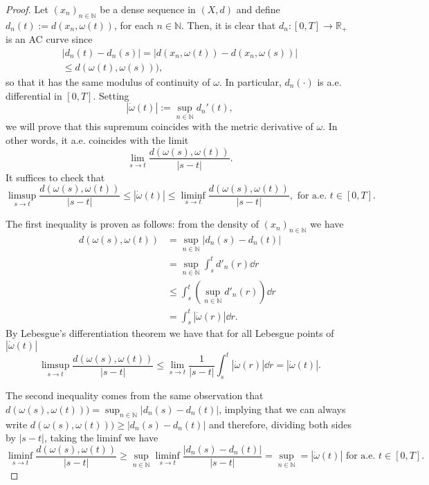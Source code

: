 \begin{proof}
	Let $\left(x_n\right)_{n \in \mathbb{N}}$ be a dense sequence in $(X,d)$ and define $d_n(t):= d(x_n, \omega(t))$, for each $n \in \mathbb{N}$. Then, it is clear that $d_n : [0,T] \to \mathbb{R}_+$ is an AC curve since 
	\begin{align*}
		|d_n(t) - d_n(s)| = |d(x_n, \omega(t)) - d(x_n, \omega(s))|\\
		\le d(\omega(t),\omega(s))), 
	\end{align*} 
	so that it has the same modulus of continuity of $\omega$. In particular, $d_n(\cdot)$ is a.e. differential in $[0,T]$. Setting 
	\begin{equation*}
		|\dot{\omega}(t)| := \sup_{n \in \mathbb{N}} d_n'(t),
	\end{equation*}
	we will prove that this supremum coincides with the metric derivative of $\omega$. In other words, it a.e. coincides with the limit 
	\begin{equation*}
		\lim_{s \to t} \frac{d(\omega(s), \omega(t))}{|s - t|}.
	\end{equation*}
	It suffices to check that 
	\begin{equation*}
		\limsup_{s \to t} \frac{d(\omega(s), \omega(t))}{|s - t|} \le |\dot{\omega}(t)| \le \liminf_{s \to t} \frac{d(\omega(s), \omega(t))}{|s - t|}, \text{ for a.e. $t \in [0,T]$.}
	\end{equation*}
	
	The first inequality is proven as follows: from the density of $(x_n)_{n \in \mathbb{N}}$ we have 
	\begin{align*}
		d(\omega(s), \omega(t)) 
		&= \sup_{n \in \mathbb{N}} |d_n(s) - d_n(t)|\\ 
		&= \sup_{n \in \mathbb{N}} \int_s^td'_n(r) \dd r\\
		&\le \int_s^t \left(\sup_{n \in \mathbb{N}} d'_n(r)\right)\dd r\\
		&= \int_s^t |\dot{\omega}(r)|\dd r.
	\end{align*}
	By Lebesgue's differentiation theorem we have that for all Lebesgue points of $|\dot{\omega}(t)|$
	\begin{equation*}
		\limsup_{s \to t} \frac{d(\omega(s), \omega(t))}{|s - t|} \le \lim_{s \to t} \frac{1}{|s - t|} \int_s^t |\dot{\omega}(r)|\dd r = |\dot{\omega}(t)|. 
	\end{equation*}
	
	The second inequality comes from the same observation that $d(\omega(s), \omega(t))) 
	= \sup_{n \in \mathbb{N}} |d_n(s) - d_n(t)|$, implying that we can always write $d(\omega(s), \omega(t))) 
	\ge |d_n(s) - d_n(t)|$ and therefore, dividing both sides by $|s - t|$, taking the liminf we have 
	\begin{equation*}
		\liminf_{s \to t} \frac{d(\omega(s), \omega(t))}{|s - t|} \ge \sup_{n \in \mathbb{N}} \liminf_{s \to t} \frac{|d_n(s) - d_n(t)|}{|s - t|} = \sup_{n \in \mathbb{N}} = |\dot{\omega}(t)| \text{ for a.e. $t \in [0,T]$.}
	\end{equation*}
\end{proof}

